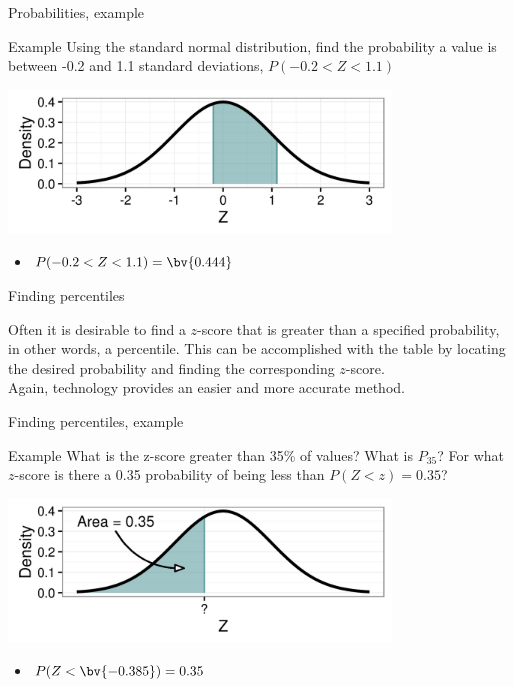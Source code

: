 \documentclass[xcolor=table, handout]{beamer}
\begin{document}
\begin{frame}{Probabilities, example}
\begin{exampleblock}{Example}
Using the standard normal distribution, find the probability a value is between -0.2 and 1.1 standard deviations, $P(-0.2 < Z < 1.1)$\\
\smallskip
{\centering
\includegraphics[width=4in]{../images/ch6_ex03}
\par}
\begin{itemize}
\pause\item $P(-0.2 < Z < 1.1) = \bv{0.444}$
\end{itemize}
\end{exampleblock}
\end{frame}

\begin{frame}{Finding percentiles}
\begin{block}{}
Often it is desirable to find a $z$-score that is greater than a specified probability, in other words, a percentile. This can be accomplished with the table by locating the desired probability and finding the corresponding $z$-score.\\
\medskip
Again, technology provides an easier and more accurate method.
\end{block}
\end{frame}

\begin{frame}{Finding percentiles, example}
\begin{exampleblock}{Example}
What is the z-score greater than 35\% of values? What is $P_{35}$? For what $z$-score is there a 0.35 probability of being less than $P(Z < z) = 0.35$?\\
\smallskip
{\centering
\includegraphics[width=4in]{../images/ch6_ex04}
\par}

\begin{itemize}
\pause\item $P(Z < \bv{-0.385}) = 0.35$
\end{itemize}
\end{exampleblock}
\end{frame}
\end{document}
